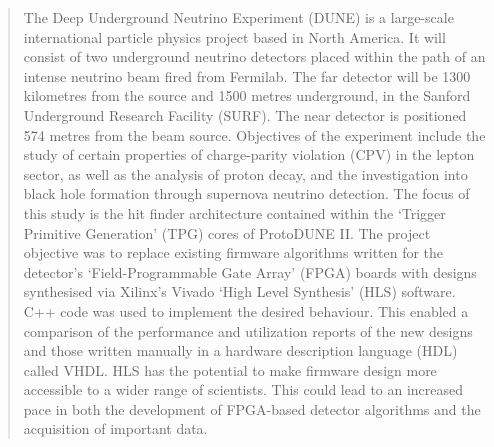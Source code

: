 \begin{titlepage}
\begin{abstract}
	The Deep Underground Neutrino Experiment (DUNE) is a large-scale international particle physics project based in North America. It will consist of two underground neutrino detectors placed within the path of an intense neutrino beam fired from Fermilab. The far detector will be 1300 kilometres from the source and 1500 metres underground, in the Sanford Underground Research Facility (SURF). The near detector is positioned 574 metres from the beam source. Objectives of the experiment include the study of certain properties of charge-parity violation (CPV) in the lepton sector, as well as the analysis of proton decay, and the investigation into black hole formation through supernova neutrino detection\cite{deep_underground_neutrino_experiment_2020}.  The focus of this study is the hit finder architecture contained within the `Trigger Primitive Generation' (TPG) cores of ProtoDUNE II. The project objective was to replace existing firmware algorithms written for the detector's `Field-Programmable Gate Array' (FPGA) boards with designs synthesised via Xilinx's Vivado `High Level Synthesis' (HLS) software. C++ code was used to implement the desired behaviour. This enabled a comparison of the performance and utilization reports of the new designs and those written manually in a hardware description language (HDL) called VHDL. HLS has the potential to make firmware design more accessible to a wider range of scientists. This could lead to an increased pace in both the development of FPGA-based detector algorithms and the acquisition of important data.
\end{abstract}

\end{titlepage}

